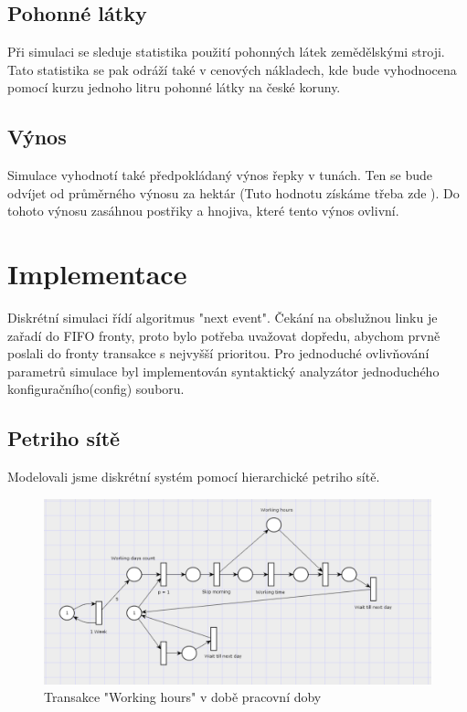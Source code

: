 \documentclass[11pt,a4paper,titlepage]{article}
\begin{document}
\subsection{Pohonné látky}
Při simulaci se sleduje statistika použití pohonných látek zemědělskými stroji. Tato statistika se pak odráží také v cenových nákladech, kde bude vyhodnocena pomocí kurzu jednoho litru pohonné látky na české koruny.

\subsection{Výnos}
Simulace vyhodnotí také předpokládaný výnos řepky v tunách. Ten se bude odvíjet od průměrného výnosu za hektár (Tuto hodnotu získáme třeba zde ). Do tohoto výnosu zasáhnou postřiky a hnojiva, které tento výnos ovlivní.

\pagebreak
\section{Implementace}
Diskrétní simulaci řídí algoritmus "next event". Čekání na obslužnou linku je zařadí do FIFO fronty, proto bylo potřeba uvažovat dopředu, abychom prvně poslali do fronty transakce s nejvyšší prioritou.
Pro jednoduché ovlivňování parametrů simulace byl implementován syntaktický analyzátor jednoduchého konfiguračního(config) souboru.

\subsection{Petriho sítě}
Modelovali jsme diskrétní systém pomocí hierarchické petriho sítě.

\begin{figure}[ht!]
\centering
\includegraphics[scale=0.3]{img/WeekGen.png}
\caption{Transakce "Working hours" v době pracovní doby}
\end{figure}
\end{document}
